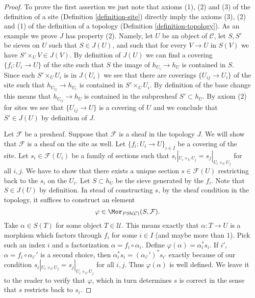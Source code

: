 \begin{proof}
To prove the first assertion we just note that axioms
(1), (2) and (3) of the definition of a site
(Definition \ref{definition-site})
directly imply the axioms
(3), (2) and (1) of the definition of a topology
(Definition \ref{definition-topology}). As an example we
prove $J$ has property (2). Namely, let $U$ be an object
of $\mathcal{C}$, let $S, S'$ be sieves on $U$ such that
$S \in J(U)$, and such that for every $V \to U$ in $S(V)$
we have $S' \times_U V \in J(V)$. By definition of $J(U)$
we can find a covering $\{f_i : U_i \to U\}$ of the site
such that $S$ the image of $h_{U_i} \to h_U$ is contained
in $S$. Since each $S'\times_U U_i$ is in $J(U_i)$ we
see that there are coverings $\{U_{ij} \to U_i\}$ of the
site such that $h_{U_{ij}} \to h_{U_i}$ is contained
in $S' \times_U U_i$. By definition of the base change
this means that $h_{U_{ij}} \to h_U$ is contained
in the subpresheaf $S' \subset h_U$. By axiom (2) for
sites we see that $\{U_{ij} \to U\}$ is a covering of
$U$ and we conclude that $S' \in J(U)$ by definition of $J$.

\medskip\noindent
Let $\mathcal{F}$ be a presheaf. Suppose that $\mathcal{F}$
is a sheaf in the topology $J$. We will show that $\mathcal{F}$
is a sheaf on the site as well. Let $\{f_i : U_i \to U\}_{i\in I}$
be a covering of the site. Let $s_i \in \mathcal{F}(U_i)$ be a
family of sections such that
$s_i|_{U_i \times_U U_j} = s_j|_{U_i \times_U U_j}$ for all
$i, j$. We have to show that there exists a unique section
$s \in \mathcal{F}(U)$ restricting back to the $s_i$ on the $U_i$.
Let $S \subset h_U$ be the sieve generated by the $f_i$.
Note that $S \in J(U)$ by definition. In stead of constructing
$s$, by the sheaf condition in the topology, it suffices
to construct an element
$$
\varphi \in \Mor_{\textit{PSh}(\mathcal{C})}(S, \mathcal{F}).
$$
Take $\alpha \in S(T)$ for some object $T \in \mathcal{U}$.
This means exactly that $\alpha : T \to U$ is a morphism
which factors through $f_i$ for some $i\in I$ (and maybe more than $1$).
Pick such an index $i$ and a factorization $\alpha = f_i \circ \alpha_i$.
Define $\varphi(\alpha) = \alpha_i^* s_i$. If $i'$, $\alpha
= f_i \circ \alpha_{i'}'$ is a second choice, then
$\alpha_i^* s_i = (\alpha_{i'}')^* s_{i'}$ exactly because of our
condition $s_i|_{U_i \times_U U_j} = s_j|_{U_i \times_U U_j}$ for all
$i, j$. Thus $\varphi(\alpha)$ is well defined. We leave it to the reader
to verify that $\varphi$, which in turn determines $s$ is correct
in the sense that $s$ restricts back to $s_i$.


\end{proof}
